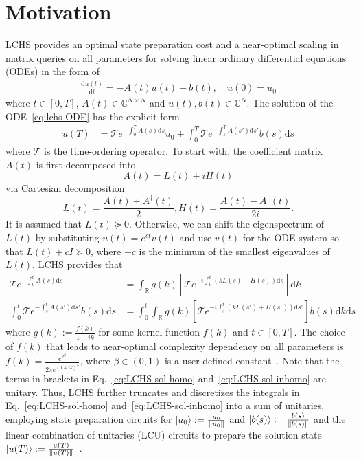 \documentclass{article}
\newcommand{\dd}{\mathrm{d}}
\newcommand{\Cbb}{\mathbb{C}}
\newcommand{\Rbb}{\mathbb{R}}
\newcommand{\Tcal}{\mathcal{T}}
\begin{document}






\section{Motivation}







LCHS provides an optimal state preparation cost and a near-optimal scaling in matrix queries on all parameters for solving linear ordinary differential equations (ODEs) in the form of
\begin{align}
    \frac{\dd u(t)}{\dd t} = -A(t)u(t) + b(t), \quad u(0) = u_0  \label{eq:lchs-ODE}
\end{align}
where $t \in [0, T]$, $A(t) \in \Cbb^{N \times N}$ and $u(t), b(t) \in \Cbb^{N}$. The solution of the ODE~\eqref{eq:lchs-ODE} has the explicit form
\begin{align}
    u(T) &= \Tcal e^{- \int^T_0 A(s) \dd s}u_0 + \int^T_0 \Tcal e^{-\int^T_s A(s')\dd s'}b(s) \dd s \label{eq:exp-sol}
\end{align}
where $\Tcal$ is the time-ordering operator. To start with, the coefficient matrix $A(t)$ is first decomposed into \[A(t) = L(t) + iH(t)\] via Cartesian decomposition \[L(t) = \frac{A(t) + A^\dagger(t)}{2}, H(t) = \frac{A(t) - A^\dagger(t)}{2i}.\] It is assumed that $L(t) \succeq 0$. Otherwise, we can shift the eigenspectrum of $L(t)$ by substituting $u(t) = e^{ct}v(t)$ and use $v(t)$ for the ODE system so that $L(t) + cI \succeq 0$, where $-c$ is the minimum of the smallest eigenvalues of $L(t)$. LCHS provides that 
\begin{align}
    \Tcal e^{- \int^t_0 A(s) \dd s} &= \int_{\Rbb}  g(k) \left[\Tcal e^{-i \int^t_0 (kL(s)+H(s))\dd s} \right] \dd k \label{eq:LCHS-sol-homo} \\
    \int^t_0 \Tcal e^{-\int^t_s A(s')\dd s'}b(s) \dd s &= \int^t_0 \int_\Rbb g(k) \left[ \Tcal e^{-i \int^t_s (kL(s')+H(s'))\dd s'} \right]  b(s) \dd k \dd s   \label{eq:LCHS-sol-inhomo}
\end{align}
where $g(k):=\frac{f(k)}{1-ik}$ for some kernel function $f(k)$ and $t \in [0,T]$. The choice of $f(k)$ that leads to near-optimal complexity dependency on all parameters is $f(k) = \frac{e^{2^{\beta}}}{2\pi e^{(1+ik)^\beta}}$, where $\beta \in (0,1)$ is a user-defined constant~\cite{LCHS2}.
Note that the terms in brackets in Eq.~\eqref{eq:LCHS-sol-homo} and~\eqref{eq:LCHS-sol-inhomo} are unitary. Thus, LCHS further truncates and discretizes the integrals in Eq.~\eqref{eq:LCHS-sol-homo} and~\eqref{eq:LCHS-sol-inhomo} into a sum of unitaries, employing state preparation circuits for $\ket{u_0}:=\frac{u_0}{\|u_0\|}$ and $\ket{b(s)}:=\frac{b(s)}{\|b(s)\|}$ and the linear combination of unitaries (LCU) circuits to prepare the solution state $\ket{u(T)}:=\frac{u(T)}{\|u(T)\|}$~\cite{LCHS1,LCHS2}.
\end{document}

